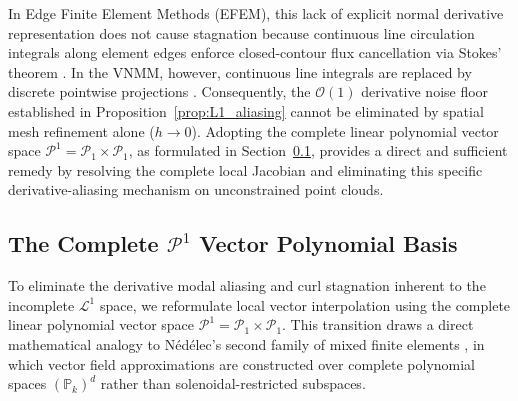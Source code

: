 \documentclass[preprint,12pt]{elsarticle}
\begin{document}
In Edge Finite Element Methods (EFEM), this lack of explicit normal derivative representation does not cause stagnation because continuous line circulation integrals along element edges enforce closed-contour flux cancellation via Stokes' theorem \cite{nedelec1980mixed, monk2003finite}. In the VNMM, however, continuous line integrals are replaced by discrete pointwise projections \cite{goncalves2025tese}. Consequently, the $\mathcal{O}(1)$ derivative noise floor established in Proposition~\ref{prop:L1_aliasing} cannot be eliminated by spatial mesh refinement alone ($h \to 0$). Adopting the complete linear polynomial vector space $\mathcal{P}^1 = \mathcal{P}_1 \times \mathcal{P}_1$, as formulated in Section~\ref{subsec:complete_P1_basis}, provides a direct and sufficient remedy by resolving the complete local Jacobian and eliminating this specific derivative-aliasing mechanism on unconstrained point clouds.


\subsection{The Complete \texorpdfstring{$\mathcal{P}^1$}{P1} Vector Polynomial Basis}
\label{subsec:complete_P1_basis}

To eliminate the derivative modal aliasing and curl stagnation inherent to the incomplete $\mathcal{L}^1$ space, we reformulate local vector interpolation using the complete linear polynomial vector space $\mathcal{P}^1 = \mathcal{P}_1 \times \mathcal{P}_1$. This transition draws a direct mathematical analogy to Nédélec's second family of mixed finite elements \cite{nedelec1986new}, in which vector field approximations are constructed over complete polynomial spaces $(\mathbb{P}_k)^d$ rather than solenoidal-restricted subspaces.
\end{document}
